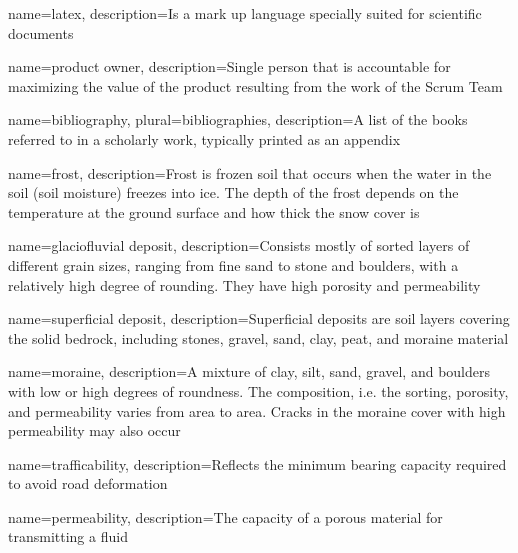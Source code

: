 

\makeglossaries %


{
        name=latex,
        description={Is a mark up language specially suited for
scientific documents}
}

{
        name=product owner,
        description={Single person that is accountable for maximizing the value of the product resulting from the work of the Scrum Team \cite{scrum_guide}}
}

{
        name=bibliography,
        plural=bibliographies,
        description={A list of the books referred to in a scholarly work, typically printed as an appendix}
}

{
    name=frost,
    description={Frost is frozen soil that occurs when the water in the soil (soil moisture) freezes into ice. The depth of the frost depends on the temperature at the ground surface and how thick the snow cover is \cite{senorge_terminology}}
}

{
    name=glaciofluvial deposit,
    description={Consists mostly of sorted layers of different grain sizes, ranging from fine sand to stone and boulders, with a relatively high degree of rounding. They have high porosity and permeability \cite{ngu_deposits}}
}

{
    name=superficial deposit,
    description={Superficial deposits are soil layers covering the solid bedrock, including stones, gravel, sand, clay, peat, and moraine material \cite{snl_losmasser}}
}

{
    name=moraine,
    description={A mixture of clay, silt, sand, gravel, and boulders with low or high degrees of roundness. The composition, i.e. the sorting, porosity, and permeability varies from area to area. Cracks in the moraine cover with high permeability may also occur \cite{ngu_deposits}}
}

{
    name=trafficability,
    description={Reflects the minimum bearing capacity required to avoid road deformation \cite{fjeld2023trafficability}}
}

{
    name=permeability,
    description={The capacity of a porous material for transmitting a fluid \cite{britannica_permeability}}
}

